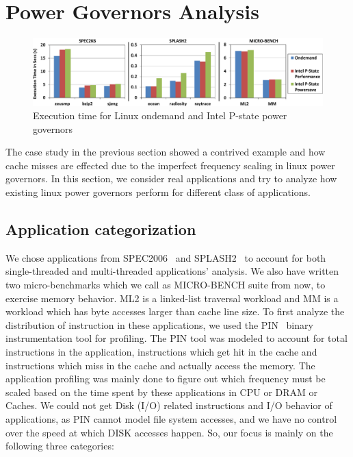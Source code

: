 \section{Power Governors Analysis}\label{sec:appl}

\begin{figure}[h]
  \begin{center}
\includegraphics[width=\linewidth]{figs/def-exec-time-crop.pdf}
  \end{center}
  \vspace{-0.1in}
  \caption{Execution time for Linux ondemand and Intel P-state power governors}
  \label{fig:def-perf}
\end{figure}

The case study in the previous section showed a contrived example and how cache misses are effected 
due to the imperfect frequency scaling in linux power governors.
In this section, we consider real applications and try to analyze how existing linux power
governors perform for different class of applications.

\subsection{Application categorization}
We chose applications from  SPEC2006~\cite{spec2006} and SPLASH2~\cite{splash2} to account for both single-threaded and 
multi-threaded applications' analysis. 
We also have written two micro-benchmarks which we call as MICRO-BENCH
suite from now, to exercise 
memory behavior. ML2 is a linked-list traversal workload and 
MM is a workload which has byte accesses larger than
cache line size. 
To first analyze the distribution of instruction in these applications,
we used the PIN~\cite{pin} binary instrumentation tool for profiling.
The PIN tool was modeled to account for total instructions in the application, 
instructions which get hit in the cache and instructions which miss in the cache
and actually access the memory. 
The application profiling was mainly done to figure out
which frequency must be scaled  
based on the time spent by these applications
in CPU or DRAM or Caches.
We could not get Disk (I/O) related instructions and I/O behavior
of applications, as PIN cannot model file system accesses, and
we have no control over the speed at which DISK accesses happen. So, our focus is
mainly on the following three categories:

